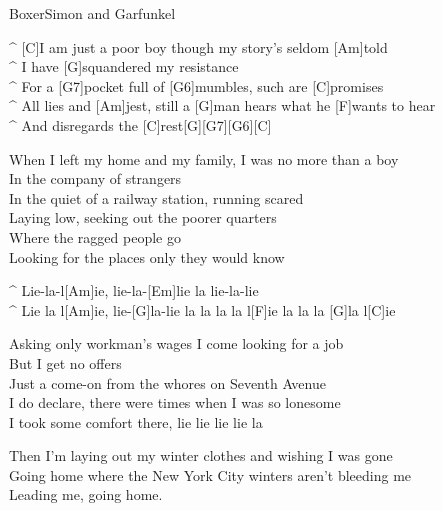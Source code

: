 \begin{song}{Boxer}{Simon and Garfunkel}


\begin{guitar}
^ [C]I am just a poor boy though my story's seldom [Am]told\\
^ I have [G]squandered my resistance\\
^ For a [G7]pocket full of [G6]mumbles, such are [C]promises\\
^ All lies and [Am]jest, still a [G]man hears what he [F]wants to hear\\
^ And disregards the [C]rest[G][G7][G6][C]\\
\end{guitar}

\begin{guitar}
When I left my home and my family, I was no more than a boy\\
In the company of strangers\\
In the quiet of a railway station, running scared\\
Laying low, seeking out the poorer quarters\\
Where the ragged people go\\
Looking for the places only they would know\\
\end{guitar}


\begin{guitar}
^ Lie-la-l[Am]ie, lie-la-[Em]lie la lie-la-lie\\
^ Lie la l[Am]ie, lie-[G]la-lie la la la la l[F]ie la la la [G]la l[C]ie\\
\end{guitar}


\begin{guitar}
Asking only workman's wages I come looking for a job\\
But I get no offers\\
Just a come-on from the whores on Seventh Avenue\\
I do declare, there were times when I was so lonesome\\
I took some comfort there, lie lie lie lie la\\
\end{guitar}



\begin{guitar}
Then I'm laying out my winter clothes and wishing I was gone\\
Going home where the New York City winters aren't bleeding me\\
Leading me, going home.\\
\end{guitar}


\end{song}

